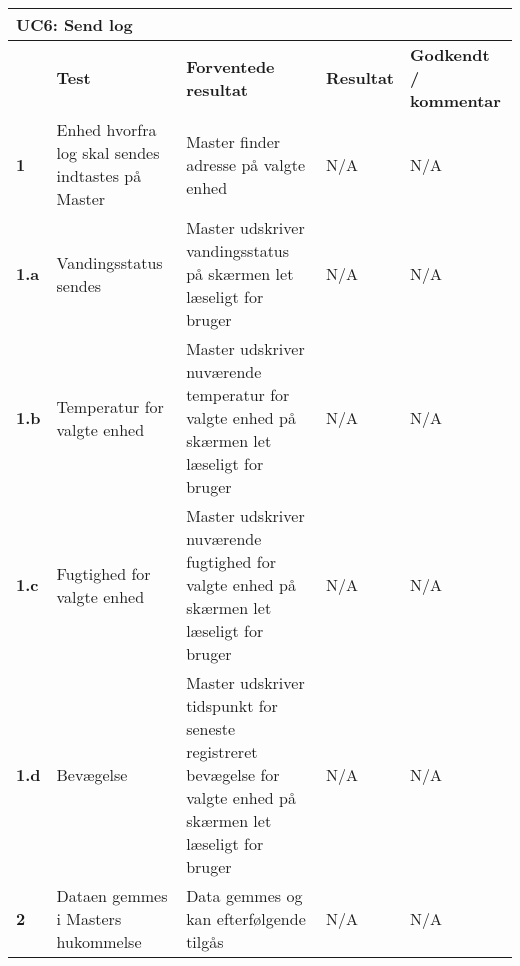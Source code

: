 
\begin{longtable}{|p{5mm}|p{40mm}|p{40mm}|p{20mm}|p{25mm}|}
\hline 
\multicolumn{5}{|l|}{\textbf{UC6: Send log}} \\ 
\hline 
& \textbf{Test} & \textbf{Forventede resultat} & \textbf{Resultat} & \textbf{Godkendt / kommentar} \\ 
\hline 
\textbf{1}& Enhed hvorfra log skal sendes indtastes på Master & Master finder adresse på valgte enhed & N/A & N/A \\ 
\hline 
\textbf{1.a}& Vandingsstatus sendes & Master udskriver vandingsstatus på skærmen let læseligt for bruger & N/A & N/A \\ 
\hline 
\textbf{1.b}& Temperatur for valgte enhed & Master udskriver nuværende temperatur for valgte enhed på skærmen let læseligt for bruger & N/A & N/A \\ 
\hline 
\textbf{1.c}& Fugtighed for valgte enhed & Master udskriver nuværende fugtighed for valgte enhed på skærmen let læseligt for bruger & N/A & N/A \\ 
\hline 
\textbf{1.d}& Bevægelse & Master udskriver tidspunkt for seneste registreret bevægelse for valgte enhed på skærmen let læseligt for bruger & N/A & N/A \\ 
\hline
\textbf{2}& Dataen gemmes i Masters hukommelse & Data gemmes og kan efterfølgende tilgås & N/A & N/A \\ 
\hline  
\end{longtable} 